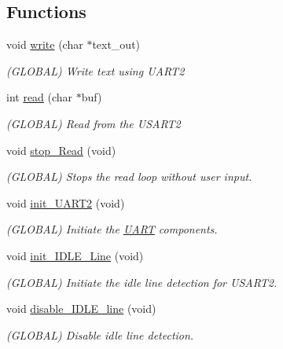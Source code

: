 \subsection*{Functions}
\begin{DoxyCompactItemize}
\item 
void \mbox{\hyperlink{namespace_u_a_r_t_a20b32a5769a95ed363726431c01702e9}{write}} (char $\ast$text\+\_\+out)
\begin{DoxyCompactList}\small\item\em (G\+L\+O\+B\+AL) Write text using U\+A\+R\+T2 \end{DoxyCompactList}\item 
int \mbox{\hyperlink{namespace_u_a_r_t_a1087fba97ca797e5ca155228ff9eec55}{read}} (char $\ast$buf)
\begin{DoxyCompactList}\small\item\em (G\+L\+O\+B\+AL) Read from the U\+S\+A\+R\+T2 \end{DoxyCompactList}\item 
void \mbox{\hyperlink{namespace_u_a_r_t_a996ffefd3d2ce666720596342364db03}{stop\+\_\+\+Read}} (void)
\begin{DoxyCompactList}\small\item\em (G\+L\+O\+B\+AL) Stops the read loop without user input. \end{DoxyCompactList}\item 
void \mbox{\hyperlink{namespace_u_a_r_t_ab8b1cbca4aa5321487c7f78df50efdc6}{init\+\_\+\+U\+A\+R\+T2}} (void)
\begin{DoxyCompactList}\small\item\em (G\+L\+O\+B\+AL) Initiate the \mbox{\hyperlink{namespace_u_a_r_t}{U\+A\+RT}} components. \end{DoxyCompactList}\item 
void \mbox{\hyperlink{namespace_u_a_r_t_aae0befbeb6fc7e852f7a200e9a9f4c7c}{init\+\_\+\+I\+D\+L\+E\+\_\+\+Line}} (void)
\begin{DoxyCompactList}\small\item\em (G\+L\+O\+B\+AL) Initiate the idle line detection for U\+S\+A\+R\+T2. \end{DoxyCompactList}\item 
void \mbox{\hyperlink{namespace_u_a_r_t_ade4e159fcbcb9a63bcf9557b23f064df}{disable\+\_\+\+I\+D\+L\+E\+\_\+line}} (void)
\begin{DoxyCompactList}\small\item\em (G\+L\+O\+B\+AL) Disable idle line detection. \end{DoxyCompactList}\item 

\end{DoxyCompactItemize}

